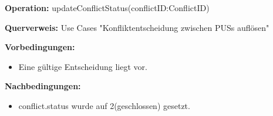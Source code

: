 \documentclass[a4paper,12pt]{article}
\begin{document}
	\begin{contractbox}
		\textbf{Operation:} updateConflictStatus(conflictID:ConflictID)
		
	\textbf{Querverweis:} Use Cases "Konfliktentscheidung zwischen PUSs auflösen"
		
		\textbf{Vorbedingungen:}
		\begin{itemize}[noitemsep]
			\item Eine gültige Entscheidung liegt vor.
		\end{itemize}
		
		\textbf{Nachbedingungen:}
		\begin{itemize}[noitemsep]
			\item conflict.status wurde auf 2(geschlossen) gesetzt.
		\end{itemize}
	\end{contractbox}
	
	
	
	
	
	
	
	
	

	
\end{document}
